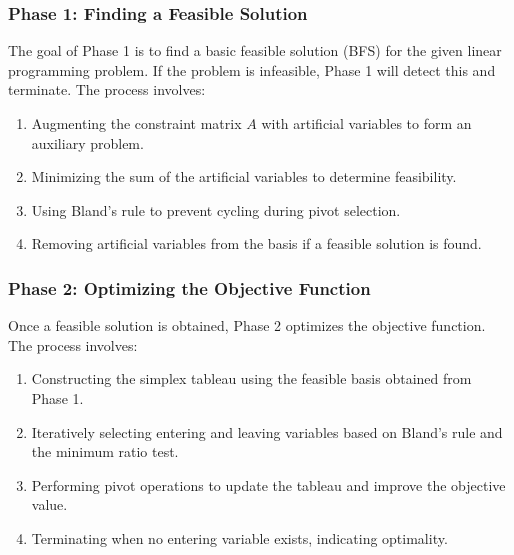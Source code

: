 \documentclass[conference]{IEEEtran}
\begin{document}
\subsubsection{Phase 1: Finding a Feasible Solution}
The goal of Phase 1 is to find a basic feasible solution (BFS) for the given linear programming problem. If the problem is infeasible, Phase 1 will detect this and terminate. The process involves:
\begin{enumerate}
    \item Augmenting the constraint matrix \( A \) with artificial variables to form an auxiliary problem.
    \item Minimizing the sum of the artificial variables to determine feasibility.
    \item Using Bland's rule to prevent cycling during pivot selection.
    \item Removing artificial variables from the basis if a feasible solution is found.
\end{enumerate}

\subsubsection{Phase 2: Optimizing the Objective Function}
Once a feasible solution is obtained, Phase 2 optimizes the objective function. The process involves:
\begin{enumerate}
    \item Constructing the simplex tableau using the feasible basis obtained from Phase 1.
    \item Iteratively selecting entering and leaving variables based on Bland's rule and the minimum ratio test.
    \item Performing pivot operations to update the tableau and improve the objective value.
    \item Terminating when no entering variable exists, indicating optimality.
\end{enumerate}
\end{document}
